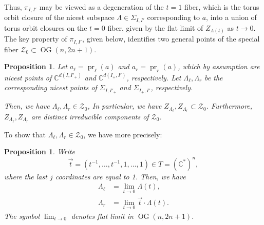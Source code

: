 \documentclass[12pt]{amsart}
\newtheorem{proposition}[definition]{Proposition}
\DeclareMathOperator{\pr}{pr}
\DeclareMathOperator{\OG}{OG}
\newcommand{\bC}{\mathbb{C}}
\newcommand{\cZ}{\mathcal{Z}}
\newcommand{\vectt}{\overrightarrow{t}}
\begin{document}
Thus, $\pi_{I,I'}$ may be viewed as a degeneration of the $t=1$ fiber, which is the torus orbit closure of the nicest subspace $\Lambda\in\Sigma_{I,I'}$ corresponding to $a$, into a union of torus orbit closures on the $t=0$ fiber, given by the flat limit of $Z_{\Lambda(t)}$ as $t\to 0$. The key property of $\pi_{I,I'}$, given below, identifies two general points of the special fiber $\cZ_0\subset\OG(n,2n+1)$.

\begin{proposition}\label{prop:identify_components}
    Let $a_\ell=\pr_\ell(a)$ and $a_r=\pr_r(a)$, which by assumption are nicest points of $\bC^{d(I,I'_+)}$ and $\bC^{d(I_+,I')}$, respectively. Let $\Lambda_\ell,\Lambda_r$ be the corresponding nicest points of $\Sigma_{I,I'_+}$ and $\Sigma_{I_+,I'}$, respectively. 
    
    Then, we have $\Lambda_\ell,\Lambda_r\in \cZ_0$, In particular, we have $Z_{\Lambda_\ell},Z_{\Lambda_r}\subset\cZ_0$. Furthermore, $Z_{\Lambda_\ell},Z_{\Lambda_r}$ are distinct irreducible components of $\cZ_0$.
\end{proposition}

To show that $\Lambda_\ell,\Lambda_r\in \cZ_0$, we have more precisely:

\begin{proposition}\label{prop:identify_limit_subspaces}
Write
\begin{equation*}
    \vectt=(t^{-1},\ldots,t^{-1},1,\ldots,1)\in T=(\bC^*)^n,
\end{equation*}
where the last $j$ coordinates are equal to 1. Then, we have
\begin{align*}
    \Lambda_\ell&=\lim_{t\to 0}\Lambda(t),\\
    \Lambda_r&=\lim_{t\to 0}\vectt\cdot \Lambda(t).
\end{align*}
 The symbol $\lim_{t\to 0}$ denotes flat limit in $\OG(n,2n+1)$.
\end{proposition}
\end{document}
